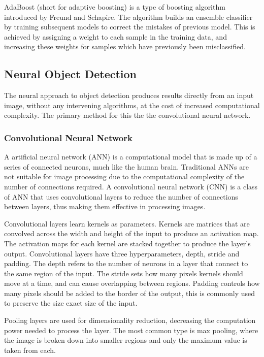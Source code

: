 AdaBoost (short for adaptive boosting) is a type of boosting algorithm introduced by Freund and Schapire\cite{Freund1996}. The algorithm builds an ensemble classifier by training subsequent models to correct the mistakes of previous model. This is achieved by assigning a weight to each sample in the training data, and increasing these weights for samples which have previously been misclassified.

\subsection{Neural Object Detection}

The neural approach to object detection produces results directly from an input image, without any intervening algorithms, at the cost of increased computational complexity. The primary method for this the the convolutional neural network.

\subsubsection{Convolutional Neural Network}

A artificial neural network (ANN) is a computational model that is made up of a series of connected neurons, much like the human brain. Traditional ANNs are not suitable for image processing due to the computational complexity of the number of connections required. A convolutional neural network (CNN) is a class of ANN that uses convolutional layers to reduce the number of connections between layers, thus making them effective in processing images.

Convolutional layers learn kernels as parameters. Kernels are matrices that are convolved across the width and height of the input to produce an activation map. The activation maps for each kernel are stacked together to produce the layer's output. Convolutional layers have three hyperparameters, depth, stride and padding. The depth refers to the number of neurons in a layer that connect to the same region of the input. The stride sets how many pixels kernels should move at a time, and can cause overlapping between regions. Padding controls how many pixels should be added to the border of the output, this is commonly used to preserve the size exact size of the input.

Pooling layers are used for dimensionality reduction, decreasing the computation power needed to process the layer. The most common type is max pooling, where the image is broken down into smaller regions and only the maximum value is taken from each. 


